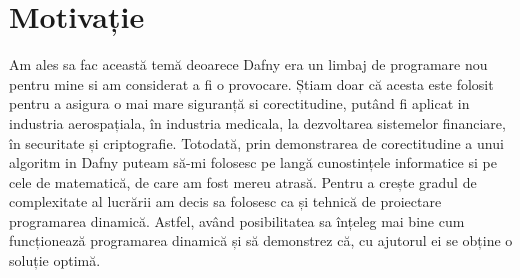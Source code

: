 \chapter*{Motivație} 

Am ales sa fac această temă deoarece Dafny era un limbaj de programare nou pentru mine si am considerat a fi o provocare. Știam doar că acesta este folosit pentru a asigura o mai mare siguranță si corectitudine, putând fi aplicat in industria aerospațiala, în industria medicala, la dezvoltarea sistemelor financiare, în securitate și  criptografie. Totodată, prin demonstrarea de corectitudine a unui algoritm in Dafny puteam să-mi folosesc pe langă cunostințele informatice si pe cele  de matematică, de care am fost mereu atrasă. Pentru a crește gradul de complexitate al lucrării am decis sa folosesc ca și tehnică de proiectare programarea dinamică. Astfel, având posibilitatea sa înțeleg mai bine cum funcționează programarea dinamică și să demonstrez că, cu ajutorul ei se obține o soluție optimă. 